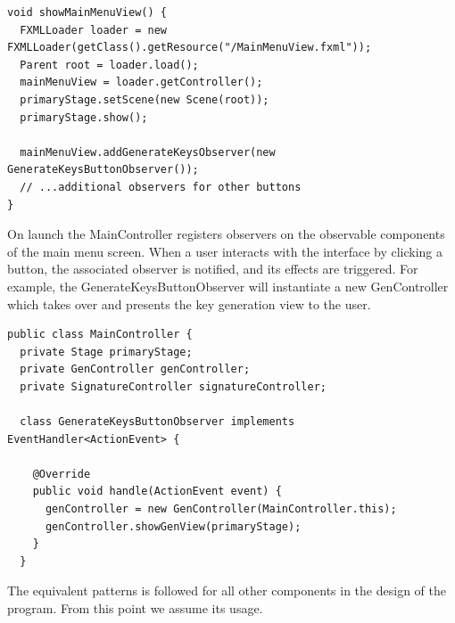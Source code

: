 \documentclass[]{final_report}
\theoremstyle{definition}
\begin{document}
\begin{lstlisting}[caption=MainController registering an observer to be notified on selection of key generation button]
void showMainMenuView() {
  FXMLLoader loader = new FXMLLoader(getClass().getResource("/MainMenuView.fxml"));
  Parent root = loader.load();
  mainMenuView = loader.getController();
  primaryStage.setScene(new Scene(root));
  primaryStage.show();

  mainMenuView.addGenerateKeysObserver(new GenerateKeysButtonObserver());
  // ...additional observers for other buttons
}
\end{lstlisting}
On launch the MainController registers observers on the observable components of the main menu screen. When a user interacts with the interface by clicking a button, the associated observer is notified, and its effects are triggered. For example, the GenerateKeysButtonObserver will instantiate a new GenController which takes over and presents the key generation view to the user. 


\begin{lstlisting}[caption=Implementation of an observer]
public class MainController {
  private Stage primaryStage;
  private GenController genController;
  private SignatureController signatureController;

  class GenerateKeysButtonObserver implements EventHandler<ActionEvent> {

    @Override
    public void handle(ActionEvent event) {
      genController = new GenController(MainController.this);
      genController.showGenView(primaryStage);
    }
  }
\end{lstlisting}
The equivalent patterns is followed for all other components in the design of the program. From this point we assume its usage.
\end{document}
